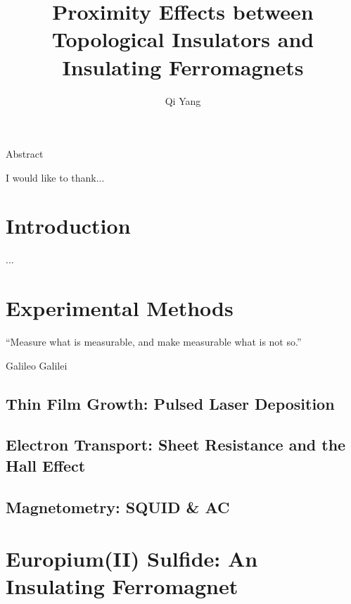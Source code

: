 \documentclass{report}
\begin{document}
\title{Proximity Effects between Topological Insulators and Insulating Ferromagnets}
\author{Qi Yang}

\beforepreface


    Abstract 


    I would like to thank...
\afterpreface

\captionsetup{width=0.95\columnwidth}%
\chapter{Introduction}\label{ch:intro}
    ...
	
\chapter{Experimental Methods}\label{ch:methods}
\epigraph{``Measure what is measurable, and make measurable what is not so.''}{Galileo Galilei}
\begin{refsection}   
    \section{Thin Film Growth: Pulsed Laser Deposition}\label{sec:pld}
		
    \section{Electron Transport: Sheet Resistance and the Hall Effect}
		
    \section{Magnetometry: SQUID \& AC}
    \printbibliography[heading=subbibintoc, title=References for Chapter~\ref{ch:methods}]
\end{refsection} 

\chapter{Europium(II) Sulfide: An Insulating Ferromagnet}\label{ch:EuS}
\begin{refsection} 
    \printbibliography[heading=subbibintoc, title=References for Chapter~\ref{ch:EuS}]
\end{refsection} 
\end{document}
